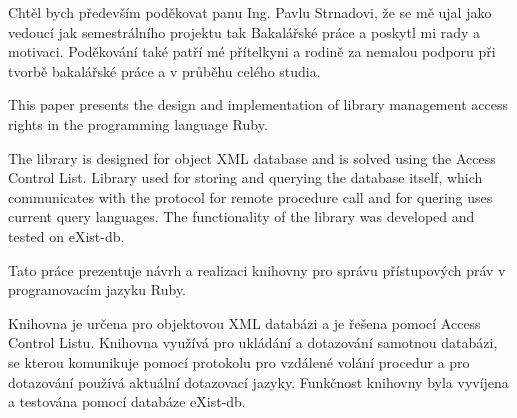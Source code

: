 \documentclass[11pt,twoside,a4paper]{book}
\begin{document}

\coverpagestarts


\acknowledgements
\noindent
Chtěl bych především poděkovat panu Ing. Pavlu Strnadovi, že se mě ujal jako vedoucí jak semestrálního projektu tak Bakalářské práce a poskytl mi rady a motivaci. Poděkování také patří mé přítelkyni a rodině za nemalou podporu při tvorbě bakalářské práce a v průběhu celého studia.




 
\abstractpage
This paper presents the design and implementation of library management access rights in the programming language Ruby.

The library is designed for object XML database and is solved using the Access Control List. Library used for storing and querying the database itself, which communicates with the protocol for remote procedure call and for quering uses current query languages.
The functionality of the library was developed and tested on eXist-db.


\baselineskip

\noindent
Tato práce prezentuje návrh a realizaci knihovny pro správu přístupových práv v programovacím jazyku Ruby. 

Knihovna  je určena pro objektovou XML databázi a je řešena pomocí Access Control Listu. Knihovna využívá pro ukládání a dotazování samotnou databázi, se kterou komunikuje pomocí protokolu pro vzdálené volání procedur a pro dotazování používá aktuální dotazovací jazyky. 
Funkčnost knihovny byla vyvíjena a testována pomocí databáze eXist-db.


\noindent

%


\tableofcontents


\end{document}
